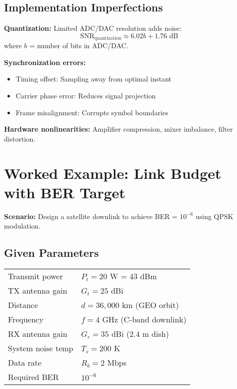 \subsection{Implementation Imperfections}

\textbf{Quantization:} Limited ADC/DAC resolution adds noise:
\begin{equation}
\mathrm{SNR}_{\mathrm{quantization}} \approx 6.02b + 1.76 \text{ dB}
\label{eq:snr-quantization}
\end{equation}
where $b$ = number of bits in ADC/DAC.

\textbf{Synchronization errors:}
\begin{itemize}
\item Timing offset: Sampling away from optimal instant
\item Carrier phase error: Reduces signal projection
\item Frame misalignment: Corrupts symbol boundaries
\end{itemize}

\textbf{Hardware nonlinearities:} Amplifier compression, mixer imbalance, filter distortion.

\section{Worked Example: Link Budget with BER Target}

\textbf{Scenario:} Design a satellite downlink to achieve BER = $10^{-6}$ using QPSK modulation.

\subsection*{Given Parameters}

\begin{tabular}{@{}ll@{}}
Transmit power & $P_t = 20$ W = 43 dBm \\
TX antenna gain & $G_t = 25$ dBi \\
Distance & $d = 36{,}000$ km (GEO orbit) \\
Frequency & $f = 4$ GHz (C-band downlink) \\
RX antenna gain & $G_r = 35$ dBi (2.4 m dish) \\
System noise temp & $T_s = 200$ K \\
Data rate & $R_b = 2$ Mbps \\
Required BER & $10^{-6}$ \\
\end{tabular}


